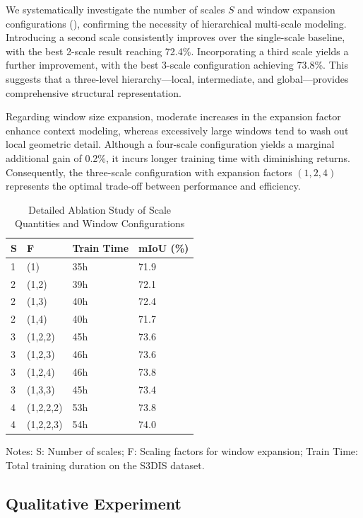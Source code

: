 \documentclass[a4paper,fleqn]{cas-sc}
\begin{document}
We systematically investigate the number of scales $S$ and window expansion configurations (), confirming the necessity of hierarchical multi-scale modeling. Introducing a second scale consistently improves over the single-scale baseline, with the best 2-scale result reaching 72.4\%. Incorporating a third scale yields a further improvement, with the best 3-scale configuration achieving 73.8\%. This suggests that a three-level hierarchy---local, intermediate, and global---provides comprehensive structural representation.

Regarding window size expansion, moderate increases in the expansion factor enhance context modeling, whereas excessively large windows tend to wash out local geometric detail. Although a four-scale configuration yields a marginal additional gain of 0.2\%, it incurs longer training time with diminishing returns. Consequently, the three-scale configuration with expansion factors $(1, 2, 4)$ represents the optimal trade-off between performance and efficiency.

\begin{table}[!t]
	\centering
	\caption{Detailed Ablation Study of Scale Quantities and Window Configurations}
	\label{tab:scale_config}
	\begin{tabular}{llll}
		\toprule
		\textbf{S} & \textbf{F} & \textbf{Train Time} & \textbf{mIoU (\%)} \\
		\midrule
		1 & (1) & 35h & 71.9 \\
		2 & (1,2) & 39h & 72.1 \\
		2 & (1,3) & 40h & 72.4 \\
		2 & (1,4) & 40h & 71.7 \\
		3 & (1,2,2) & 45h & 73.6 \\
		3 & (1,2,3) & 46h & 73.6 \\
		3 & (1,2,4) & 46h & 73.8 \\
		3 & (1,3,3) & 45h & 73.4 \\
		4 & (1,2,2,2) & 53h & 73.8 \\
		4 & (1,2,2,3) & 54h & 74.0 \\
		\bottomrule
	\end{tabular}
	\par\vspace{3pt}
	\footnotesize Notes: S: Number of scales; F: Scaling factors for window expansion; Train Time: Total training duration on the S3DIS dataset.
\end{table}

\subsection{Qualitative Experiment}
\end{document}

